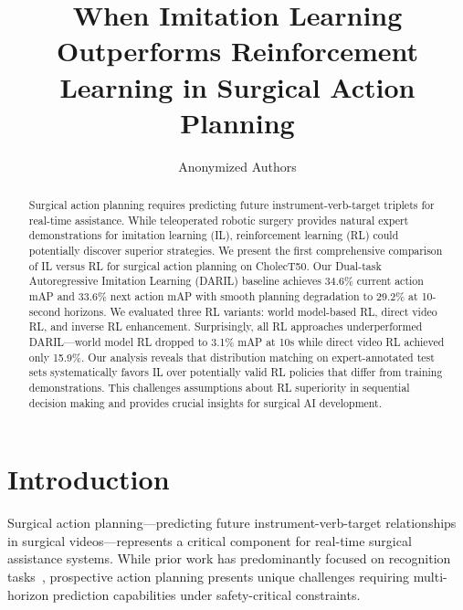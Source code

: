 \documentclass[runningheads]{llncs}
\begin{document}
%
\title{When Imitation Learning Outperforms Reinforcement Learning in Surgical Action Planning}
%
\author{Anonymized Authors}

\maketitle
%
\begin{abstract}
Surgical action planning requires predicting future instrument-verb-target triplets for real-time assistance. While teleoperated robotic surgery provides natural expert demonstrations for imitation learning (IL), reinforcement learning (RL) could potentially discover superior strategies. We present the first comprehensive comparison of IL versus RL for surgical action planning on CholecT50. Our Dual-task Autoregressive Imitation Learning (DARIL) baseline achieves 34.6\% current action mAP and 33.6\% next action mAP with smooth planning degradation to 29.2\% at 10-second horizons. We evaluated three RL variants: world model-based RL, direct video RL, and inverse RL enhancement. Surprisingly, all RL approaches underperformed DARIL—world model RL dropped to 3.1\% mAP at 10s while direct video RL achieved only 15.9\%. Our analysis reveals that distribution matching on expert-annotated test sets systematically favors IL over potentially valid RL policies that differ from training demonstrations. This challenges assumptions about RL superiority in sequential decision making and provides crucial insights for surgical AI development.

\end{abstract}

\section{Introduction}

Surgical action planning—predicting future instrument-verb-target relationships in surgical videos—represents a critical component for real-time surgical assistance systems. While prior work has predominantly focused on recognition tasks~\cite{nwoye2022cholect50,nwoye2020recognition,nwoye2023cholectriplet2021}, prospective action planning presents unique challenges requiring multi-horizon prediction capabilities under safety-critical constraints.
\end{document}

